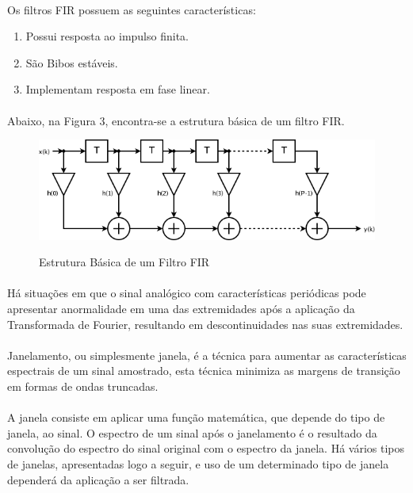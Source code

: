 \documentclass[12pt,fleqn]{article}
\begin{document}
\paragraph{} Os filtros FIR possuem as seguintes características:
\begin{enumerate}
    \item Possui resposta ao impulso finita. 
    \item São Bibos estáveis.
    \item Implementam resposta em fase linear.
    \\
\end{enumerate}

\paragraph{} Abaixo, na Figura 3, encontra-se a estrutura básica de um filtro FIR.

\begin{figure}[!htb]
    \centering
    \includegraphics[scale=0.5]{fig/figura3.png}
    \label{figura:diagrama2}
    \caption{Estrutura Básica de um Filtro FIR}
\end{figure}

\paragraph{} Há situações em que o sinal analógico com características periódicas pode apresentar anormalidade em uma das extremidades após a aplicação da Transformada de Fourier, resultando em descontinuidades nas suas extremidades.
\paragraph{} Janelamento, ou simplesmente janela, é a técnica para aumentar as características espectrais de um sinal amostrado, esta técnica minimiza as margens de transição em formas de ondas truncadas.
\paragraph{} A janela consiste em aplicar uma função matemática, que depende do tipo de janela, ao sinal. O espectro de um sinal após o janelamento é o resultado da convolução do espectro do sinal original com o espectro da janela. Há vários tipos de janelas, apresentadas logo a seguir, e uso de um determinado tipo de janela dependerá da aplicação a ser filtrada.
\end{document}
